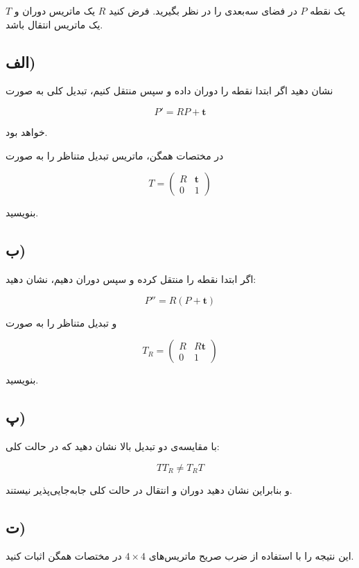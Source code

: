 \documentclass[a4paper,16pt]{article}
\begin{document}
	یک نقطه $P$ در فضای سه‌بعدی را در نظر بگیرید. فرض کنید $R$ یک ماتریس دوران و $T$ یک ماتریس انتقال باشد.
	
	\subsection*{الف)}
	
	نشان دهید اگر ابتدا نقطه را دوران داده و سپس منتقل کنیم، تبدیل کلی به صورت
	
	\[
	P'=RP+\mathbf{t}
	\]
	
	خواهد بود.
	
	در مختصات همگن، ماتریس تبدیل متناظر را به صورت
	
	\[
	T=
	\begin{pmatrix}
		R&\mathbf{t}\\
		0&1
	\end{pmatrix}
	\]
	
	بنویسید.
	
	\subsection*{ب)}
	
	اگر ابتدا نقطه را منتقل کرده و سپس دوران دهیم، نشان دهید:
	
	\[
	P''=R(P+\mathbf{t})
	\]
	
	و تبدیل متناظر را به صورت
	
	\[
	T_R=
	\begin{pmatrix}
		R&R\mathbf{t}\\
		0&1
	\end{pmatrix}
	\]
	
	بنویسید.
	
	\subsection*{پ)}
	
	با مقایسه‌ی دو تبدیل بالا نشان دهید که در حالت کلی:
	
	\[
	\boxed{
		TT_R\neq T_RT
	}
	\]
	
	و بنابراین نشان دهید دوران و انتقال در حالت کلی جابه‌جایی‌پذیر نیستند.
	
	\subsection*{ت)}
	
	این نتیجه را با استفاده از ضرب صریح ماتریس‌های $4\times4$ در مختصات همگن اثبات کنید.
	
	
	
\end{document}
